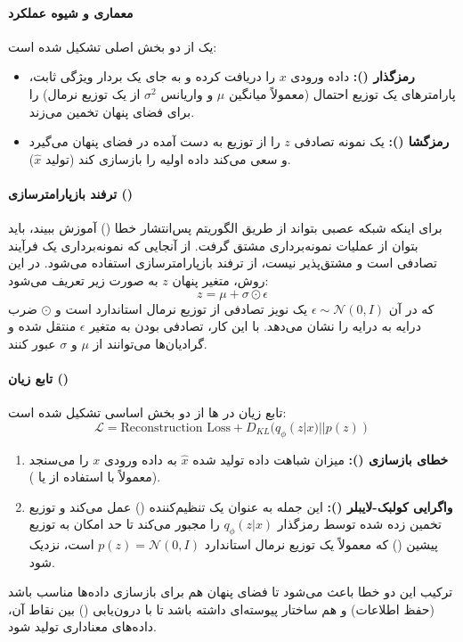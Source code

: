 \documentclass{article}
\begin{document}
\paragraph{معماری و شیوه عملکرد}
یک  از دو بخش اصلی تشکیل شده است:
\begin{itemize}
	\item \textbf{رمزگذار ():} داده ورودی $x$ را دریافت کرده و به جای یک بردار ویژگی ثابت، پارامترهای یک توزیع احتمال (معمولاً میانگین $\mu$ و واریانس $\sigma^2$ از یک توزیع نرمال) را برای فضای پنهان تخمین می‌زند.
	\item \textbf{رمزگشا ():} یک نمونه تصادفی $z$ را از توزیع به دست آمده در فضای پنهان می‌گیرد و سعی می‌کند داده اولیه را بازسازی کند (تولید $\hat{x}$).
\end{itemize}

\paragraph{ترفند بازپارامترسازی ()}
برای اینکه شبکه عصبی بتواند از طریق الگوریتم پس‌انتشار خطا () آموزش ببیند، باید بتوان از عملیات نمونه‌برداری مشتق گرفت. از آنجایی که نمونه‌برداری یک فرآیند تصادفی است و مشتق‌پذیر نیست، از ترفند بازپارامترسازی استفاده می‌شود. در این روش، متغیر پنهان $z$ به صورت زیر تعریف می‌شود:
$$ z = \mu + \sigma \odot \epsilon $$
که در آن $\epsilon \sim \mathcal{N}(0, I)$ یک نویز تصادفی از توزیع نرمال استاندارد است و $\odot$ ضرب درایه به درایه را نشان می‌دهد. با این کار، تصادفی بودن به متغیر $\epsilon$ منتقل شده و گرادیان‌ها می‌توانند از $\mu$ و $\sigma$ عبور کنند.

\paragraph{تابع زیان ()}
تابع زیان در ها از دو بخش اساسی تشکیل شده است:
$$ \mathcal{L} = \text{Reconstruction Loss} + D_{KL}(q_\phi(z|x) || p(z)) $$
\begin{enumerate}
	\item \textbf{خطای بازسازی ():} میزان شباهت داده تولید شده $\hat{x}$ به داده ورودی $x$ را می‌سنجد (معمولاً با استفاده از  یا ).
	\item \textbf{واگرایی کولبک-لایبلر ():} این جمله به عنوان یک تنظیم‌کننده () عمل می‌کند و توزیع تخمین زده شده توسط رمزگذار $q_\phi(z|x)$ را مجبور می‌کند تا حد امکان به توزیع پیشین () که معمولاً یک توزیع نرمال استاندارد $p(z) = \mathcal{N}(0, I)$ است، نزدیک شود.
\end{enumerate}
ترکیب این دو خطا باعث می‌شود تا فضای پنهان هم برای بازسازی داده‌ها مناسب باشد (حفظ اطلاعات) و هم ساختار پیوسته‌ای داشته باشد تا با درون‌یابی () بین نقاط آن، داده‌های معناداری تولید شود.
\end{document}
